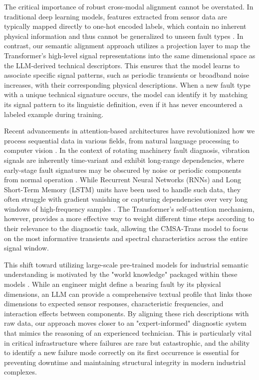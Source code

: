 \documentclass[journal]{IEEEtran}
\begin{document}
The critical importance of robust cross-modal alignment cannot be overstated. In traditional deep learning models, features extracted from sensor data are typically mapped directly to one-hot encoded labels, which contain no inherent physical information and thus cannot be generalized to unseen fault types \cite{goodfellow2016deep, lecun2015deep}. In contrast, our semantic alignment approach utilizes a projection layer to map the Transformer's high-level signal representations into the same dimensional space as the LLM-derived technical descriptors. This ensures that the model learns to associate specific signal patterns, such as periodic transients or broadband noise increases, with their corresponding physical descriptions. When a new fault type with a unique technical signature occurs, the model can identify it by matching its signal pattern to its linguistic definition, even if it has never encountered a labeled example during training.

Recent advancements in attention-based architectures have revolutionized how we process sequential data in various fields, from natural language processing to computer vision \cite{devlin2018bert, dosovitskiy2020image}. In the context of rotating machinery fault diagnosis, vibration signals are inherently time-variant and exhibit long-range dependencies, where early-stage fault signatures may be obscured by noise or periodic components from normal operation \cite{zhang2021attention}. While Recurrent Neural Networks (RNNs) and Long Short-Term Memory (LSTM) units have been used to handle such data, they often struggle with gradient vanishing or capturing dependencies over very long windows of high-frequency samples \cite{hochreiter1997long}. The Transformer’s self-attention mechanism, however, provides a more effective way to weight different time steps according to their relevance to the diagnostic task, allowing the CMSA-Trans model to focus on the most informative transients and spectral characteristics across the entire signal window.

This shift toward utilizing large-scale pre-trained models for industrial semantic understanding is motivated by the "world knowledge" packaged within these models \cite{zhao2023brain}. While an engineer might define a bearing fault by its physical dimensions, an LLM can provide a comprehensive textual profile that links those dimensions to expected sensor responses, characteristic frequencies, and interaction effects between components. By aligning these rich descriptions with raw data, our approach moves closer to an "expert-informed" diagnostic system that mimics the reasoning of an experienced technician. This is particularly vital in critical infrastructure where failures are rare but catastrophic, and the ability to identify a new failure mode correctly on its first occurrence is essential for preventing downtime and maintaining structural integrity in modern industrial complexes.
\end{document}

